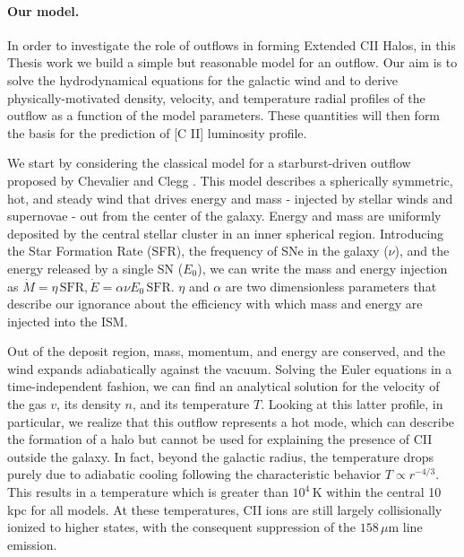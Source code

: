 \documentclass[12pt]{article}
\begin{document}
\paragraph{Our model.} In order to investigate the role of outflows in forming Extended CII Halos, in this Thesis work we build a simple but reasonable model for an outflow. Our aim is to solve the hydrodynamical equations for the galactic wind and to derive physically-motivated density, velocity, and temperature radial profiles of the outflow as a function of the model parameters. These quantities will then form the basis for the prediction of [C II] luminosity profile.

We start by considering the classical model for a starburst-driven outflow proposed by Chevalier and Clegg \citep{chevalier_clegg:1985}. This model describes a spherically symmetric, hot, and steady wind that drives energy and mass - injected by stellar winds and supernovae - out from the center of the galaxy. Energy and mass are uniformly deposited by the central stellar cluster in an inner spherical region. Introducing the Star Formation Rate (SFR), the frequency of SNe in the galaxy ($\nu$), and the energy released by a single SN ($E_0$), we can write the mass and energy injection as $\dot{M}=\eta \,\mathrm{SFR}, \dot{E}=\alpha \nu E_0 \,\mathrm{SFR}$. $\eta$ and $\alpha$ are two dimensionless parameters that describe our ignorance about the efficiency with which mass and energy are injected into the ISM. 

Out of the deposit region, mass, momentum, and energy are conserved, and the wind expands adiabatically against the vacuum.
Solving the Euler equations in a time-independent fashion, we can find an analytical solution for the velocity of the gas $v$, its density $n$, and its temperature $T$. Looking at this latter profile, in particular, we realize that this outflow represents a hot mode, which can describe the formation of a halo but cannot be used for explaining the presence of CII outside the galaxy.
In fact, beyond the galactic radius, the temperature drops purely due to adiabatic cooling following the characteristic behavior $T\propto r^{-4/3}$. This results in a temperature which is greater than $10^4\,\mathrm{K}$ within the central 10 kpc for all models. At these temperatures, CII ions are still largely collisionally ionized to higher states, with the consequent suppression of the $158 \,\mu\mathrm{m}$ line emission. 
\end{document}
